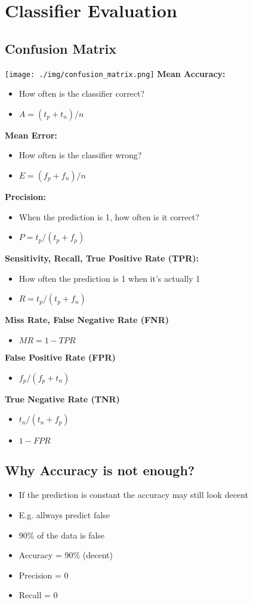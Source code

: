 \section{Classifier Evaluation}
\subsection{Confusion Matrix}
\texttt{[image: ./img/confusion\_matrix.png]}
\textbf{Mean Accuracy:}
\begin{itemize}
    \item How often is the classifier correct?
    \item $A = (t_p + t_n) / n$
\end{itemize}
\textbf{Mean Error:}
\begin{itemize}
    \item How often is the classifier wrong?
    \item $E = (f_p + f_n) / n$
\end{itemize}
\textbf{Precision:}
\begin{itemize}
    \item When the prediction is 1, how often is it correct?
    \item $P = t_p / (t_p + f_p)$
\end{itemize}
\textbf{Sensitivity, Recall, True Positive Rate (TPR):}
\begin{itemize}
    \item How often the prediction is 1 when it's actually 1
    \item $R = t_p / (t_p + f_n)$
\end{itemize}
\textbf{Miss Rate, False Negative Rate (FNR)}
\begin{itemize}
    \item $MR = 1 - TPR$
\end{itemize}
\textbf{False Positive Rate (FPR)}
\begin{itemize}
    \item $f_p / (f_p + t_n)$
\end{itemize}
\textbf{True Negative Rate (TNR)}
\begin{itemize}
    \item $t_n / (t_n + f_p)$
    \item $1 - FPR$
\end{itemize}

\subsection{Why Accuracy is not enough?}
\begin{itemize}
    \item If the prediction is constant the accuracy may still look decent
    \item E.g. allways predict false
    \item 90\% of the data is false
    \item Accuracy = 90\% (decent)
    \item Precision = 0
    \item Recall = 0
\end{itemize}

